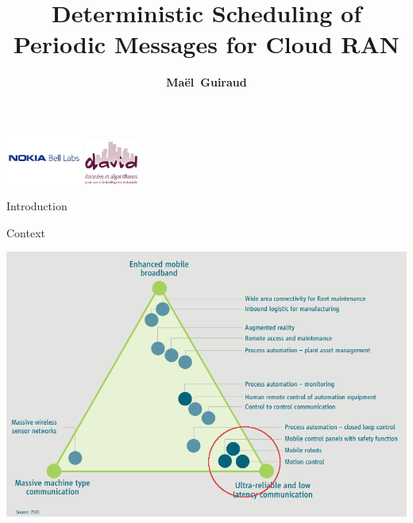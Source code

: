 \documentclass[10 pt]{beamer}
\title{Deterministic Scheduling of Periodic Messages for Cloud RAN}
\author{{\bf Maël~Guiraud}}
\institute[Nokia Bell Labs, DAVID-UVSQ] 
{
  Nokia Bell Labs France - DAVID, Universit\'e de Versailles Saint Quentin
   \\
}
\begin{document}
\begin{frame}

  \titlepage
  \centering
  \includegraphics [width=25mm]{logon.png} \hspace{1cm} \includegraphics [width=17.5mm]{logod.png} \\
\end{frame}




\begin{section}{Introduction}

\begin{frame}{Context}


  \centering
  
  \includegraphics[scale=0.4]{usecases.png}
  

\end{frame}



\end{section}
\end{document}
